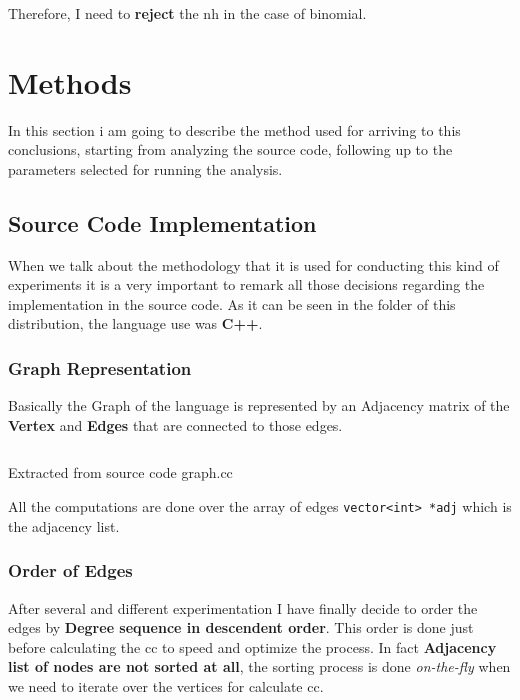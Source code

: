 \documentclass[12pt, a4paper]{article}
\begin{document}
Therefore, I need to \textbf{reject} the \acrshort{nh} in the case of \acrshort{binomial}.

\section{Methods}
In this section i am going to describe the method used for arriving to this conclusions, starting from analyzing the source code, following up to the parameters selected
for running the analysis.

\subsection{Source Code Implementation}
When we talk about the methodology that it is used for conducting this kind of experiments it is a very important to remark all those decisions regarding the implementation in the source
code.
As it can be seen in the folder of this distribution, the language use was \textbf{C++}.

\subsubsection{Graph Representation}

Basically the Graph of the language is represented by an Adjacency matrix of the \textbf{Vertex} and \textbf{Edges} that are connected to those edges.

\begin{listing}[H]
    \inputminted[firstline=40, lastline=46, breaklines]{cpp}{../src/domain/graph.cc}
    \caption{Extracted from source code graph.cc}
    \label{source:code:1}
\end{listing}  

All the computations are done over the array of edges \texttt{vector<int> *adj} which is the adjacency list.

\subsubsection{Order of Edges}
After several and different experimentation I have finally decide to order the edges by \textbf{Degree sequence in descendent order}.
This order is done just before calculating the \acrshort{cc} to speed and optimize the process. In fact \textbf{Adjacency list of nodes are not sorted at all},
the sorting process is done \textit{on-the-fly} when we need to iterate over the vertices for calculate \acrshort{cc}.
\end{document}
